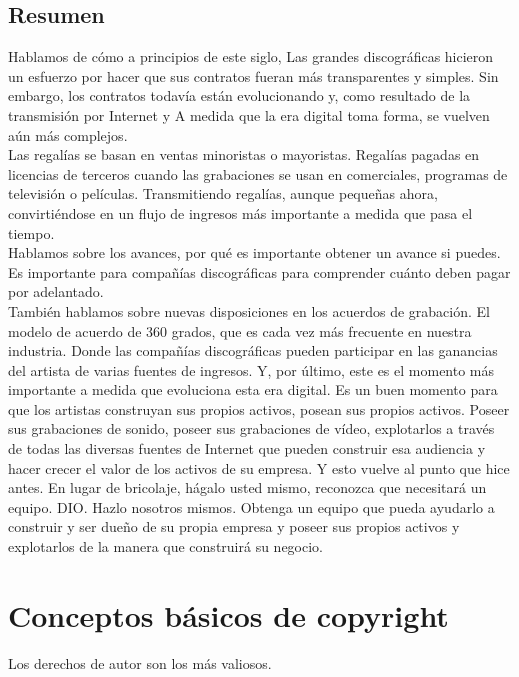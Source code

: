 \documentclass[10pt]{book}
\begin{document}
\section{Resumen}
Hablamos de cómo a principios de este siglo, Las grandes discográficas hicieron un esfuerzo por hacer que sus contratos fueran más transparentes y simples. Sin embargo, los contratos todavía están evolucionando y, como resultado de la transmisión por Internet y A medida que la era digital toma forma, se vuelven aún más complejos.\\
Las regalías se basan en ventas minoristas o mayoristas. Regalías pagadas en licencias de terceros cuando las grabaciones se usan en comerciales, programas de televisión o películas. Transmitiendo regalías, aunque pequeñas ahora, convirtiéndose en un flujo de ingresos más importante a medida que pasa el tiempo.\\
Hablamos sobre los avances, por qué es importante obtener un avance si puedes. Es importante para compañías discográficas para comprender cuánto deben pagar por adelantado.\\
También hablamos sobre nuevas disposiciones en los acuerdos de grabación. El modelo de acuerdo de 360 grados, que es cada vez más frecuente en nuestra industria. Donde las compañías discográficas pueden participar en las ganancias del artista de varias fuentes de ingresos. Y, por último, este es el momento más importante a medida que evoluciona esta era digital. Es un buen momento para que los artistas construyan sus propios activos, posean sus propios activos. Poseer sus grabaciones de sonido, poseer sus grabaciones de vídeo, explotarlos a través de todas las diversas fuentes de Internet que pueden construir esa audiencia y hacer crecer el valor de los activos de su empresa. Y esto vuelve al punto que hice antes. En lugar de bricolaje, hágalo usted mismo, reconozca que necesitará un equipo. DIO. Hazlo nosotros mismos. Obtenga un equipo que pueda ayudarlo a construir y ser dueño de su propia empresa y poseer sus propios activos y explotarlos de la manera que construirá su negocio.
  
\chapter{Conceptos básicos de copyright}
Los derechos de autor son los más valiosos.
\end{document}

